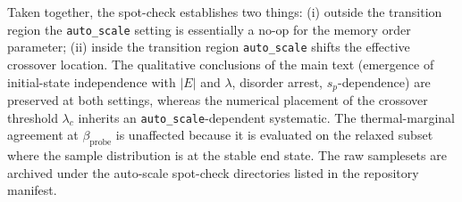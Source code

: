 \documentclass[aps,prapplied,reprint,superscriptaddress,floatfix,nofootinbib]{revtex4-2}
\begin{document}
Taken together, the spot-check establishes two things: (i) outside the transition region the \texttt{auto\_scale} setting is essentially a no-op for the memory order parameter; (ii) inside the transition region \texttt{auto\_scale} shifts the effective crossover location.  The qualitative conclusions of the main text (emergence of initial-state independence with $|E|$ and $\lambda$, disorder arrest, $s_p$-dependence) are preserved at both settings, whereas the numerical placement of the crossover threshold $\lambda_c$ inherits an \texttt{auto\_scale}-dependent systematic.  The thermal-marginal agreement at $\beta_\mathrm{probe}$ is unaffected because it is evaluated on the relaxed subset where the sample distribution is at the stable end state.
The raw samplesets are archived under the auto-scale spot-check directories listed in the repository manifest.
\end{document}
